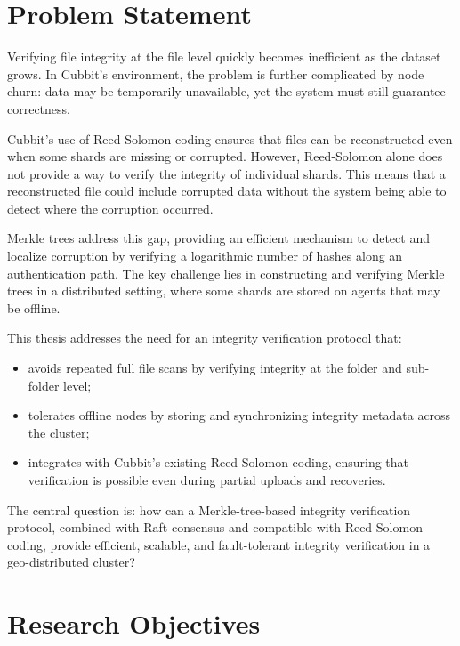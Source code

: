 \section{Problem Statement}
Verifying file integrity at the file level quickly becomes inefficient as the dataset grows. In Cubbit's environment, the problem is further complicated by node churn: data may be temporarily unavailable, yet the system must still guarantee correctness.

Cubbit's use of Reed-Solomon coding ensures that files can be reconstructed even when some shards are missing or corrupted. However, Reed-Solomon alone does not provide a way to verify the integrity of individual shards. This means that a reconstructed file could include corrupted data without the system being able to detect where the corruption occurred.

Merkle trees address this gap, providing an efficient mechanism to detect and localize corruption by verifying a logarithmic number of hashes along an authentication path. The key challenge lies in constructing and verifying Merkle trees in a distributed setting, where some shards are stored on agents that may be offline.

This thesis addresses the need for an integrity verification protocol that:
\begin{itemize}
	\item avoids repeated full file scans by verifying integrity at the folder and sub-folder level;
	\item tolerates offline nodes by storing and synchronizing integrity metadata across the cluster;
	\item integrates with Cubbit's existing Reed-Solomon coding, ensuring that verification is possible even during partial uploads and recoveries.
\end{itemize}

The central question is: how can a Merkle-tree-based integrity verification protocol, combined with Raft consensus and compatible with Reed-Solomon coding, provide efficient, scalable, and fault-tolerant integrity verification in a geo-distributed cluster?

\section{Research Objectives}

